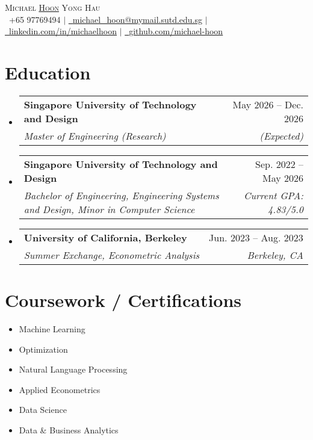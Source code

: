 \documentclass[letterpaper,11pt]{article}
\makeatletter
\newcommand{\resumeSubheading}[4]{
  \vspace{-2pt}\item
    \begin{tabular*}{1.0\textwidth}[t]{l@{\extracolsep{\fill}}r}
      \textbf{#1} & \small #2 \\
      \textit{\small#3} & \textit{\small #4} \\
    \end{tabular*}\vspace{-7pt}
}
\newcommand{\resumeSubHeadingListStart}{\begin{itemize}[leftmargin=0.0in, label={}]}
\newcommand{\resumeSubHeadingListEnd}{\end{itemize}}
\makeatother
\begin{document}
\begin{center}
    {\Huge \scshape Michael \underline{Hoon} Yong Hau} \\ \vspace{8pt}
    \small \raisebox{-0.1\height}\faPhone\ +65 97769494 $\vert$ \hspace*{0.1pt} \href{mailto:michael_hoon@mymail.sutd.edu.sg}{\raisebox{-0.2\height}\faEnvelope\  \underline{michael\_hoon@mymail.sutd.edu.sg}} \hspace*{0.1pt} $\vert$ \hspace*{0.1pt} 
    \href{https://linkedin.com/in/michaelhoon}{\raisebox{-0.2\height}\faLinkedin\ \underline{linkedin.com/in/michaelhoon}} \hspace*{0.1pt} $\vert$ \hspace*{0.1pt}
    \href{https://github.com/michael-hoon}{\raisebox{-0.2\height}\faGithub\ \underline{github.com/michael-hoon}}
\end{center}


\section{Education}
  \resumeSubHeadingListStart
    \resumeSubheading
      {Singapore University of Technology and Design}{May 2026 -- Dec. 2026}
      {Master of Engineering (Research)}{(Expected)}
    \resumeSubheading
      {Singapore University of Technology and Design}{Sep. 2022 -- May 2026}
      {Bachelor of Engineering, Engineering Systems and Design, Minor in Computer Science}{Current GPA: 4.83/5.0}
    \resumeSubheading
    {University of California, Berkeley}{Jun. 2023 -- Aug. 2023}
    {Summer Exchange, Econometric Analysis}{Berkeley, CA}
  \resumeSubHeadingListEnd

\section{Coursework / Certifications}
        \begin{multicols}{3}
            \begin{itemize}[itemsep=-5pt, parsep=3pt]
                \item\small Machine Learning  
                \item Optimization
                \item Natural Language Processing
                \item Applied Econometrics
                \item Data Science 
                \item Data \& Business Analytics
            \end{itemize}
        \end{multicols}
\end{document}
